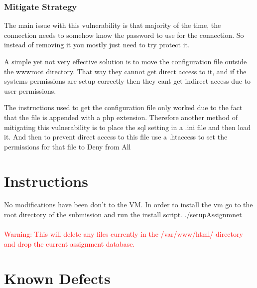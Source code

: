 \documentclass[titlepage]{article}
\begin{document}

      \subsubsection{Mitigate Strategy} %
      \label{ssub:hard-coded_passwords_mitigate_strategy}
      
      The main issue with this vulnerability is that majority of the time, the connection needs to somehow know the password to use for the connection. So instead of removing it you mostly just need to try protect it.

      A simple yet not very effective solution is to move the configuration file outside the wwwroot directory. That way they cannot get direct access to it, and if the systems permissions are setup correctly then they cant get indirect access due to user permissions. 

      The instructions used to get the configuration file only worked due to the fact that the file is appended with a php extension. Therefore another method of mitigating this vulnerability is to place the sql setting in a .ini file and then load it. And then to prevent direct access to this file use a .htaccess to set the permissions for that file to Deny from All 




\section{Instructions} %
\label{sec:instructions}

No modifications have been don't to the VM. In order to install the vm go to the root directory of the submission and run the install script. ./setupAssignmnet \\\\ 
\textcolor{red}{Warning: This will delete any files currently in the /var/www/html/ directory and drop the current assignment database.}


\section{Known Defects} %
\label{sec:known_defects}
\end{document}
